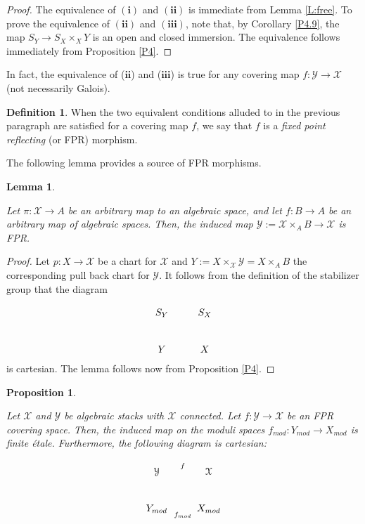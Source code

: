 \documentclass{amsart}
\newtheorem{lem}[thm]{Lemma}
\newtheorem{prop}[thm]{Proposition}
\theoremstyle{definition}
\newtheorem{defn}[thm]{Definition}
\theoremstyle{remark}
\theoremstyle{remark}
\newcommand{\X}{\mathcal{X}}
\newcommand{\Y}{\mathcal{Y}}
\newcommand{\Xm}{X_{mod}}
\newcommand{\Ym}{Y_{mod}}
\newcommand{\x}{\times}
\let\:=\colon
\begin{document}
\begin{proof} The equivalence of  $(\mathbf{i})$ and  $(\mathbf{ii})$
is immediate from Lemma \ref{L:free}. To prove the equivalence of
$(\mathbf{ii})$ and  $(\mathbf{iii})$, note that, by Corollary
\ref{P4.9}, the map $S_Y \to S_X \x_X Y$ is an open and closed
immersion. The equivalence follows immediately from Proposition
\ref{P4}.
\end{proof}

In fact, the equivalence of ($\mathbf{ii}$) and ($\mathbf{iii}$)
is true for any covering map $f \: \Y \to \X$ (not necessarily
Galois).

\begin{defn}{\label{D:FPR}}
When the two equivalent conditions alluded to in the previous
paragraph are satisfied for a covering map $f$, we say that $f$ is
a {\em fixed point reflecting} (or FPR) morphism.
\end{defn}


The following lemma provides a source of FPR morphisms.

\begin{lem}{\label{G7}}

Let $\pi \: \X \to A$ be an arbitrary map to an algebraic space,
and let $f \: B \to A$ be an arbitrary map of algebraic spaces.
Then, the induced map $\Y :=\X \x_A B \to \X$ is FPR.

\end{lem}

\begin{proof}

Let $p \: X \to \X$ be a chart for $\X$ and $Y:=X\x_{\X}\Y=X\x_AB$
the corresponding pull back chart for $\Y$. It follows from the
definition of the stabilizer group that the diagram

$$\xymatrix{ S_Y \ar[r] \ar[d] & S_X \ar[d] \\
             Y \ar[r] & X }$$
 is cartesian. The lemma follows now from Proposition \ref{P4}.
 \end{proof}

\begin{prop}{\label{G8}}

Let $\X$ and $\Y$ be algebraic stacks with $\X$ connected. Let $f
\: \Y \to \X$ be an FPR covering space. Then, the induced map on
the moduli spaces $f_{mod} \: \Ym \to \Xm$ is finite \'{e}tale.
Furthermore, the following diagram is cartesian:

$$\xymatrix{ \Y \ar[r]^{f} \ar[d] & \X \ar[d] \\
             \Ym \ar[r]_{f_{mod}} & \Xm }$$
\end{prop}
\end{document}
